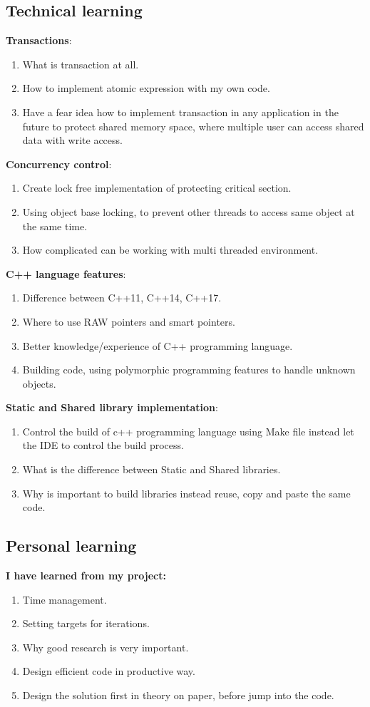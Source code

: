 \documentclass[12pt]{article}
\begin{document}
\subsection{Technical learning}
\textbf{Transactions}:
\begin{enumerate}
\item What is transaction at all. 
\item How to implement atomic expression with my own code.
\item Have a fear idea how to implement transaction in any application in the future to protect shared memory space, where multiple user can access shared data with write access.
\end{enumerate}
\textbf{Concurrency control}:
\begin{enumerate}
\item Create lock free implementation of protecting critical section. 
\item Using object base locking, to prevent other threads to access same object at the same time.
\item How complicated can be working with multi threaded environment.
\end{enumerate}
\textbf{C++ language features}:
\begin{enumerate}
\item Difference between C++11, C++14, C++17.
\item Where to use RAW pointers and smart pointers.
\item Better knowledge/experience of C++ programming language.
\item Building code, using polymorphic programming features to handle unknown objects.
\end{enumerate}
\textbf{Static and Shared library implementation}:
\begin{enumerate}
\item Control the build of c++ programming language using Make file instead let the IDE to control the build process.
\item What is the difference between Static and Shared libraries.
\item Why is important to build libraries instead reuse, copy and paste the same code.
\end{enumerate}
\subsection{Personal learning}
\textbf{I have learned from my project:}
\begin{enumerate}
\item Time management.
\item Setting targets for iterations.
\item Why good research is very important.
\item Design efficient code in productive way.
\item Design the solution first in theory on paper, before jump into the code.
\end{enumerate}
\end{document}
